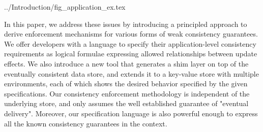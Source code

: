  {../Introduction/fig_application_ex.tex}

In this paper, we address these issues by introducing a principled approach to 
derive enforcement mechanisms for various forms of weak consistency 
guarantees. We offer developers with a language to specify their application-level consistency 
requirements as logical formulae expressing allowed relationships between update effects. 
We also introduce a new tool that generates a shim layer on top of the eventually 
consistent data store, and extends it to a key-value store with multiple environments, each of which 
shows the desired behavior specified by the given specifications. Our consistency enforcement 
methodology is independent of the underlying store, and only assumes the well established 
guarantee of "eventual delivery". 
Moreover, our specification language is also powerful enough to express all the known consistency 
guarantees in the context. 

